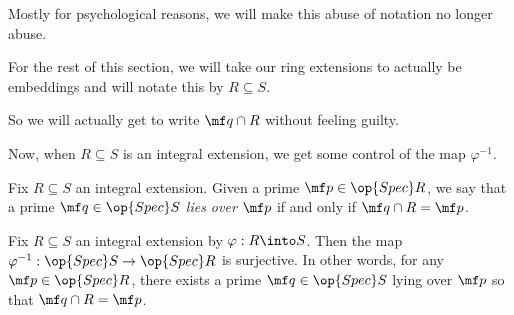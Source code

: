 Mostly for psychological reasons, we will make this abuse of notation no longer abuse.
\begin{convention}
	For the rest of this section, we will take our ring extensions to actually be embeddings and will notate this by $R\subseteq S$.
\end{convention}
So we will actually get to write $\mf q\cap R$ without feeling guilty.

Now, when $R\subseteq S$ is an integral extension, we get some control of the map $\varphi^{-1}$.
\begin{definition}
	Fix $R\subseteq S$ an integral extension. Given a prime $\mf p\in\op{Spec}R$, we say that a prime $\mf q\in\op{Spec}S$ \textit{lies over $\mf p$} if and only if $\mf q\cap R=\mf p$.
\end{definition}
\begin{proposition} \label{prop:liftprimes}
	Fix $R\subseteq S$ an integral extension by $\varphi:R\into S$. Then the map $\varphi^{-1}:\op{Spec}S\to\op{Spec}R$ is surjective. In other words, for any $\mf p\in\op{Spec}R$, there exists a prime $\mf q\in\op{Spec}S$ lying over $\mf p$ so that $\mf q\cap R=\mf p$.
\end{proposition}
